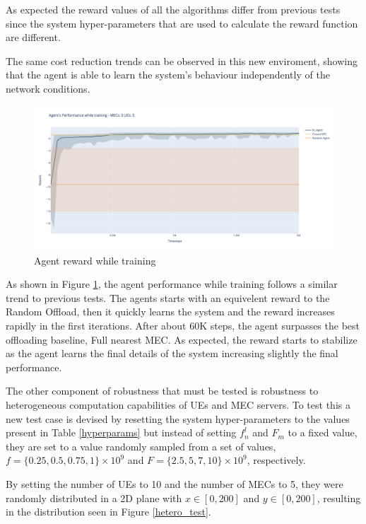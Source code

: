 As expected the reward values of all the algorithms differ from previous tests since the system hyper-parameters that are used to calculate the reward function are different.

The same cost reduction trends can be observed in this new enviroment, showing that the agent is able to learn the system's behaviour independently of the network conditions.

\begin{figure}[H]
  \centering
  \includegraphics[width=\textwidth]{images/5_5_training.png}
  \caption{Agent reward while training}  \label{robust_training}
\end{figure}

As shown in Figure \ref{robust_training}, the agent performance while training follows a similar trend to previous tests. The agents starts with an equivelent reward to the Random Offload, then it quickly learns the system and the reward increases rapidly in the first iterations. After about 60K steps, the agent surpasses the best offloading baseline, Full nearest MEC. As expected, the reward starts to stabilize as the agent learns the final details of the system increasing slightly the final performance.

The other component of robustness that must be tested is robustness to heterogeneous computation capabilities of \acrshort{UE}s and \acrshort{MEC} servers. To test this a new test case is devised by resetting the system hyper-parameters to the values present in Table \ref{hyperparams} but instead of setting $f^l_n$ and $F_m$ to a fixed value, they are set to a value randomly sampled from a set of values, $f = \{0.25, 0.5, 0.75, 1\} \times 10^9$ and $F = \{2.5, 5, 7, 10\} \times 10^9$, respectively.

By setting the number of \acrshort{UE}s to 10 and the number of \acrshort{MEC}s to 5, they were randomly distributed in a 2D plane with $x \in [0, 200]$ and $y \in [0, 200]$, resulting in the distribution seen in Figure \ref{hetero_test}.

